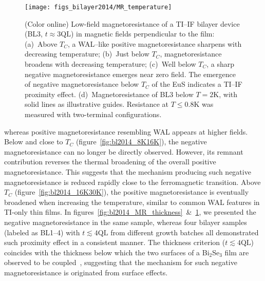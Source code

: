 \begin{figure}[ht]%
\centering%
\subfloat{\label{fig:bl2014_16K30K}}%
\subfloat{\label{fig:bl2014_8K16K}}%
\subfloat{\label{fig:bl2014_2K8K}}%
\subfloat{\label{fig:bl2014_He3}}%
\texttt{[image: figs\_bilayer2014/MR\_temperature]}%
\caption[Magnetoresistance of a Bi$_2$Se$_3$--EuS bilayer in different temperature ranges]{\label{fig:bl2014_MR_temperature}(Color online) Low-field magnetoresistance of a TI--IF bilayer device (BL3, $t\approx3\mathrm{QL}$) in magnetic fields perpendicular to the film: (a)~Above $T_C$, a WAL--like positive magnetoresistance sharpens with decreasing temperature; (b)~Just below $T_C$, magnetoresistance broadens with decreasing temperature; (c)~Well below $T_C$, a sharp negative magnetoresistance emerges near zero field. The emergence of negative magnetoresistance below $T_C$ of the EuS indicates a TI--IF proximity effect. (d)~Magnetoresistance of BL3 below $T=2$K, with solid lines as illustrative guides. Resistance at $T\leq0.8\mathrm{K}$ was measured with two-terminal configurations.}
\end{figure}%
%
whereas positive magnetoresistance resembling WAL appears at higher fields. Below and close to $T_C$ (figure~\ref{fig:bl2014_8K16K}), the negative magnetoresistance can no longer be directly observed. However, its remnant contribution reverses the thermal broadening of the overall positive magnetoresistance. This suggests that the mechanism producing such negative magnetoresistance is reduced rapidly close to the ferromagnetic transition. Above $T_C$ (figure~\ref{fig:bl2014_16K30K}), the positive magnetoresistance is eventually broadened when increasing the temperature, similar to common WAL features in TI-only thin films. In figures~\ref{fig:bl2014_MR_thickness}~\&~\ref{fig:bl2014_MR_temperature}, we presented the negative magnetoresistance in the same sample, whereas four bilayer samples (labeled as BL1--4) with $t\lesssim4\mathrm{QL}$ from different growth batches all demonstrated such proximity effect in a consistent manner. The thickness criterion ($t\lesssim4\mathrm{QL}$) coincides with the thickness below which the two surfaces of a Bi$_2$Se$_3$ film are observed to be coupled~\cite{ARPES_thickness}, suggesting that the mechanism for such negative magnetoresistance is originated from surface effects.

